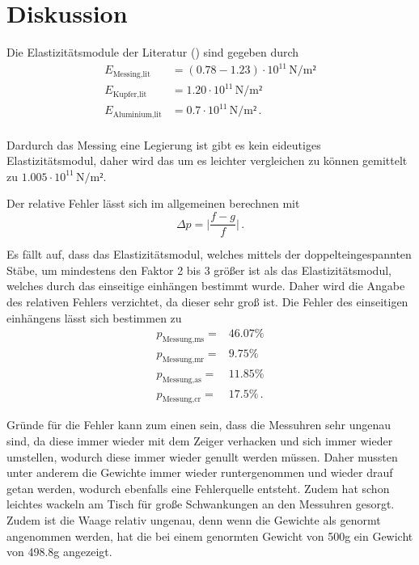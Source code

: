 \newpage
\section{Diskussion}
\label{sec:Diskussion}

Die Elastizitätsmodule der Literatur (\cite{Elastizitätsmodul}) sind gegeben durch
\begin{align*}
     E_\text{Messing,lit} &= (0.78 - 1.23) \cdot 10^{11}  \, \si{\newton\per\meter²}\\
     E_\text{Kupfer,lit} &= 1.20 \cdot 10^{11} \, \si{\newton\per\meter²}\\
     E_\text{Aluminium,lit} &= 0.7 \cdot 10^{11} \, \si{\newton\per\meter²} \, . \\
\end{align*} 

Dardurch das Messing eine Legierung ist gibt es kein eideutiges Elastizitätsmodul, daher wird das um es leichter vergleichen zu können gemittelt zu $1.005 \cdot 10^{11} \, \si{\newton\per\meter²}$.

\noindent
Der relative Fehler lässt sich im allgemeinen berechnen mit 
\begin{equation*}
    \Delta p = \bigg |\frac{f-g}{f} \bigg | \, .
\end{equation*}

Es fällt auf, dass das Elastizitätsmodul, welches mittels der doppelteingespannten Stäbe, um mindestens den Faktor 2 bis 3 größer ist als das Elastizitätsmodul, welches
durch das einseitige einhängen bestimmt wurde. Daher wird die Angabe des relativen Fehlers verzichtet, da dieser sehr groß ist.
Die Fehler des einseitigen einhängens lässt sich bestimmen zu
\begin{align*}
    p_\text{Messung,ms} =& 46.07 \si{\percent}   \\
    p_\text{Messung,mr} =& 9.75 \si{\percent}  \\
    p_\text{Messung,as} =& 11.85 \si{\percent}\\
    p_\text{Messung,cr} =& 17.5 \si{\percent} \, .
\end{align*}

\noindent
Gründe für die Fehler kann zum einen sein, dass die Messuhren sehr ungenau sind, da diese immer wieder mit dem Zeiger verhacken und sich immer wieder umstellen, wodurch 
diese immer wieder genullt werden müssen. Daher mussten unter anderem die Gewichte immer wieder runtergenommen und wieder drauf getan werden, wodurch ebenfalls eine Fehlerquelle
entsteht.  Zudem hat schon leichtes wackeln am Tisch für große Schwankungen an den Messuhren gesorgt.
Zudem ist die Waage relativ ungenau, denn wenn die Gewichte als genormt angenommen werden, hat die bei einem genormten Gewicht von 500g ein Gewicht von 498.8g angezeigt. 

